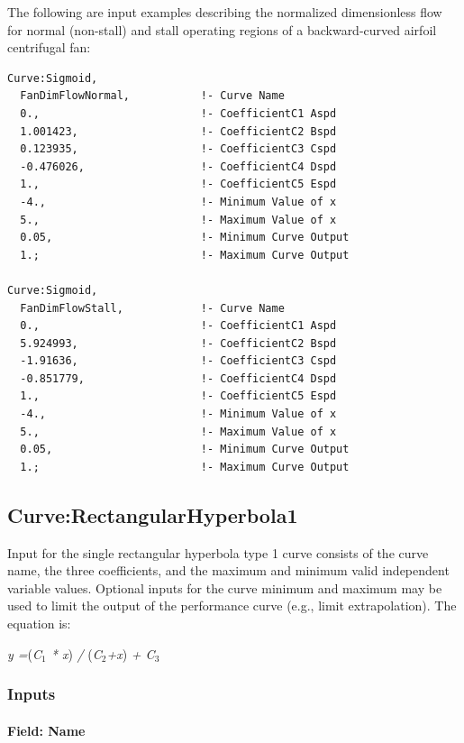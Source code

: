 The following are input examples describing the normalized dimensionless flow for normal (non-stall) and stall operating regions of a backward-curved airfoil centrifugal fan:

\begin{lstlisting}
Curve:Sigmoid,
  FanDimFlowNormal,           !- Curve Name
  0.,                         !- CoefficientC1 Aspd
  1.001423,                   !- CoefficientC2 Bspd
  0.123935,                   !- CoefficientC3 Cspd
  -0.476026,                  !- CoefficientC4 Dspd
  1.,                         !- CoefficientC5 Espd
  -4.,                        !- Minimum Value of x
  5.,                         !- Maximum Value of x
  0.05,                       !- Minimum Curve Output
  1.;                         !- Maximum Curve Output

Curve:Sigmoid,
  FanDimFlowStall,            !- Curve Name
  0.,                         !- CoefficientC1 Aspd
  5.924993,                   !- CoefficientC2 Bspd
  -1.91636,                   !- CoefficientC3 Cspd
  -0.851779,                  !- CoefficientC4 Dspd
  1.,                         !- CoefficientC5 Espd
  -4.,                        !- Minimum Value of x
  5.,                         !- Maximum Value of x
  0.05,                       !- Minimum Curve Output
  1.;                         !- Maximum Curve Output
\end{lstlisting}

\subsection{Curve:RectangularHyperbola1}\label{curverectangularhyperbola1}

Input for the single rectangular hyperbola type 1 curve consists of the curve name, the three coefficients, and the maximum and minimum valid independent variable values. Optional inputs for the curve minimum and maximum may be used to limit the output of the performance curve (e.g., limit extrapolation). The equation is:

\emph{y =}(\emph{C\(_{1}\) * x}) \emph{/} (\emph{C\(_{2}\)+x}) \emph{+ C\(_{3}\)}

\subsubsection{Inputs}\label{inputs-15-008}

\paragraph{Field: Name}\label{field-name-15-005}

